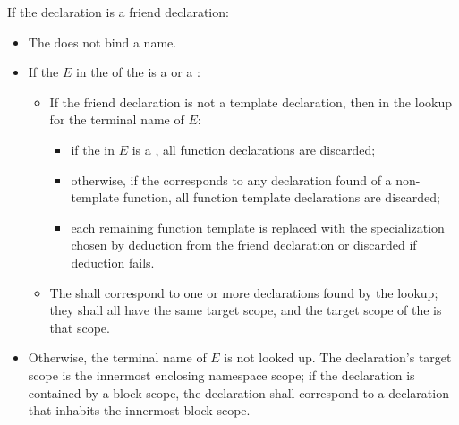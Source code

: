 \pnum
If the declaration is a friend declaration:
\begin{itemize}
\item
The  does not bind a name.
\item
If the  $E$ in
the  of the  is
a  or a :
\begin{itemize}
  \item
If the friend declaration is not a template declaration,
then in the lookup for the terminal name of $E$:
\begin{itemize}
    \item
if the  in $E$ is a ,
all function declarations are discarded;
    \item
otherwise,
if the  corresponds to
any declaration found of a non-template function,
all function template declarations are discarded;
    \item
each remaining function template is replaced with the specialization chosen by
deduction from the friend declaration or
discarded if deduction fails.
\end{itemize}
  \item
The  shall correspond to
one or more declarations found by the lookup;
they shall all have the same target scope, and
the target scope of the  is that scope.
\end{itemize}
\item
Otherwise, the terminal name of $E$ is not looked up.
The declaration's target scope is the innermost enclosing namespace scope;
if the declaration is contained by a block scope,
the declaration shall correspond to a declaration
that inhabits the innermost block scope.
\end{itemize}

